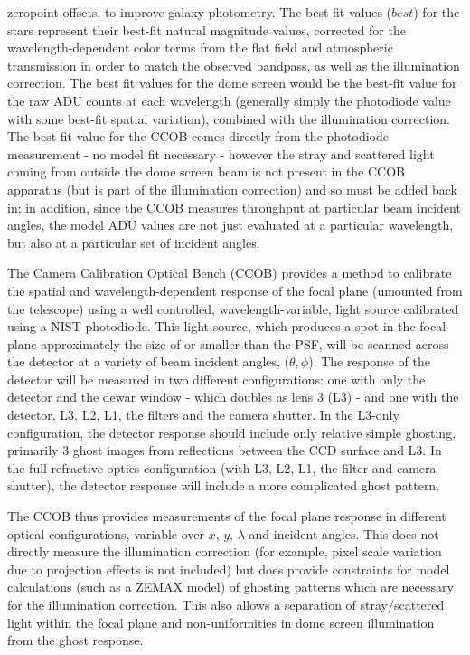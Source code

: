\documentclass[12pt,preprint]{aastex}
\begin{document}
zeropoint offsets, to improve galaxy photometry. The best fit values ($best$)
for the stars represent their best-fit natural magnitude values, corrected for the wavelength-dependent color
terms from the flat field and atmospheric transmission in order 
to match the observed bandpass, as well as the illumination
correction. The best fit values for the dome screen would be the
best-fit value for the raw ADU counts at each wavelength (generally simply the
photodiode value with some best-fit spatial
variation), combined with the illumination
correction. The best fit value for the CCOB comes directly from the
photodiode measurement - no model fit necessary - however the
stray and scattered light coming from outside the dome screen beam is
not present in the CCOB apparatus (but is part of the illumination
correction) and so must be added back in; in addition,
since the CCOB measures throughput at particular beam incident
angles, the model ADU values are not just evaluated at a particular
wavelength, but also at a particular set of incident angles. 


The Camera Calibration Optical Bench (CCOB) provides a method to
calibrate the spatial and wavelength-dependent response of the focal
plane (umounted from the telescope) using a well controlled,
wavelength-variable, light source calibrated using a NIST
photodiode. This light source, which produces a spot in the focal
plane approximately the size of or smaller than the PSF, will be
scanned across the detector at a variety of beam incident angles, ($\theta,\phi$). The
response of the detector will be measured in two different
configurations: one with only the detector and the dewar window -
which doubles as lens 3 (L3) - and one with the detector, L3, L2, L1,
the filters and the camera shutter. In the L3-only configuration, the
detector response should include only relative simple ghosting,
primarily 3 ghost images from reflections between the CCD surface and
L3. In the full refractive optics configuration (with L3, L2, L1, the
filter and camera shutter), the detector response will include a more
complicated ghost pattern.

The CCOB thus provides measurements of the focal plane response in
different optical configurations, variable over $x$, $y$, $\lambda$ and incident
angles. This does not directly measure the illumination
correction (for example, pixel scale variation due to projection
effects is not included) but does provide constraints for model
calculations (such as a ZEMAX model) of ghosting patterns which are
necessary for the illumination correction. This also allows a
separation of stray/scattered light within the focal plane and
non-uniformities in dome screen illumination from the ghost response.
\end{document}
